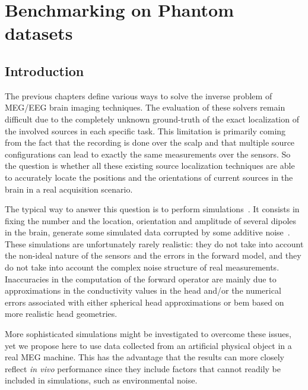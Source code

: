 
\chapter{Benchmarking on Phantom datasets}
\label{chapter:benchmark}
\noindent\makebox[\linewidth]{\rule{0.75\paperwidth}{0.4pt}}
\noindent\makebox[\linewidth]{\rule{0.75\paperwidth}{0.4pt}}

\localtableofcontents %

\noindent\makebox[\linewidth]{\rule{0.75\paperwidth}{0.4pt}}
\noindent\makebox[\linewidth]{\rule{0.75\paperwidth}{0.4pt}}
\newpage

\section{Introduction}
The previous chapters define various ways to solve the inverse problem of MEG/EEG brain imaging techniques. The evaluation of these solvers remain difficult due to the completely unknown ground-truth of the exact localization of the involved sources in each specific task. This limitation is primarily coming from the fact that the recording is done over the scalp and that multiple source configurations can lead to exactly the same measurements over the sensors. So the question is whether all these existing source localization techniques are able to accurately locate the positions and the orientations of current sources in the brain in a real acquisition scenario.

The typical way to answer this question is to perform simulations~\cite{liu2002monte,mosher1993error,liu1998spatiotemporal}. It consists in fixing the number and the location, orientation and amplitude of several dipoles in the brain, generate some simulated data corrupted by some additive noise~\cite{liu2002monte,mosher1993error,liu1998spatiotemporal,de2002estimating,wolters2006influence}. These simulations are unfortunately rarely realistic: they do not take into account the non-ideal nature of the sensors and the errors in the forward model, and they do not take into account the complex noise structure of real measurements. Inaccuracies in the computation of the forward operator are mainly due to approximations in the conductivity values in the head and/or the numerical errors associated with either spherical head approximations or \ac{bem} based on more realistic head geometries.

More sophisticated simulations might be investigated to overcome these issues, yet we propose here to use data collected from an artificial physical object in a real MEG machine. This has the advantage that the results can more closely reflect \textit{in vivo} performance since they include factors that cannot readily be included in simulations, such as environmental noise. 

